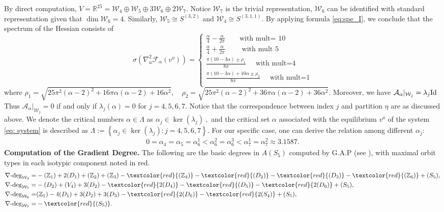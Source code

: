 \documentclass{amsart}%
\def\noi{\noindent}
\def\noi{\noindent}
\begin{document}
\noindent By direct computation,
$V=\mathbb R^{25}=\mathcal W_{4}\oplus \mathcal W_{5}\oplus 3\mathcal W_{6}\oplus 2\mathcal W_{7}.$
Notice $\mathcal W_{7}$ is the trivial representation, $\mathcal W_{6}$ can be identified with standard representation given that $\dim \mathcal W_{6}=4.$ Similarly, $\mathcal W_{5}\cong S^{(3,2)}$ and $\mathcal W_{4}\cong S^{(3,1,1)}.$ By applying formula \eqref{eq:spe_I}, we conclude that the spectrum of the Hessian consists of
\begin{equation}
\label{eq:spectrum}\sigma(\nabla^{2}_u\mathcal F_{\alpha}(v^{o}))=\begin{cases}
\frac{\alpha}{4}-\frac{\alpha}{2\pi}  \qquad  \text{
with mult= }10\\
\frac{\alpha}{4}+\frac{\alpha}{2\pi}\qquad  \text{ with mult }5\\
\frac{\pi(10-3\alpha)\pm \rho_1}{8\pi}\quad \text{ with mult=} 4\\
\frac{\pi(10-3\alpha)+10\alpha\pm \rho_2}{8\pi}\quad \text{ with mult=} 1\\
\end{cases}
\end{equation}
where $\rho_1=\sqrt{25\pi^2(\alpha-2)^2+16\pi\alpha(\alpha-2)+16\alpha^2},\quad \rho_2=\sqrt{25\pi^2(\alpha-2)^2+36\pi\alpha(\alpha-2)+36\alpha^2}.$
Moreover, we have
$\mathcal A_{\alpha}|_{\mathcal W_{j}}=\lambda_j  \text{\textrm{Id\,}}$
Thus $\mathcal A_{\alpha}|_{\mathcal W_{j}}=0$ if and only if $\lambda_j(\alpha)=0$ for $j=4,5,6,7$. Notice that the correspondence between index $j$ and partition $\eta$ are as discussed above. We denote the critical numbers $\alpha\in\Lambda$ as
$\alpha_{j}\in\ker(\lambda_j)~,$
and the critical set $\alpha$ associated with the equilibrium $v^{o}$ of the system
\eqref{eq: system} is described as
$\Lambda:=\left\{ \alpha_j\in \ker(\lambda_j):j=4,5,6,7\right\} .$
\noi For our specific case, one can derive the relation among different $\alpha_{j}:$
\begin{align}\label{sq:ordering}
0=\alpha_{4}=\alpha_{5}=\alpha_{6}^1<\alpha_{6}^2=\alpha_{6}^3<\alpha_{7}^1=\alpha_{7}^2\approx 3.1587.
\end{align}
\textbf{Computation of the Gradient Degree.}
The following are the basic degrees in $A(S_5)$ computed by G.A.P (see \cite{balanov2025degree}), with maximal orbit types in each isotypic component noted in red.
\begin{align}\label{eqn:basicdegree}
\nabla\text{-deg}_{\mathcal W_{4}}=&-(\mathbb Z_1)+2(D_1)+(\mathbb Z_2)+(\mathbb Z_3)-\textcolor{red}{(\mathbb Z_4)}-\textcolor{red}{(D_2)}-\textcolor{red}{(D_3)}-\textcolor{red}{(\mathbb Z_6)}+(S_5),\\
\nabla\text{-deg}_{\mathcal W_{5}}=&-(D_2)+(V_4)+3(D_2)-\textcolor{red}{2(D_4)}-\textcolor{red}{(D_5)}-\textcolor{red}{2(D_6)}+(S_5),\notag\\
\nabla\text{-deg}_{\mathcal W_{6}}=& (\mathbb Z_1)-4(D_1)+3(D_2)+3(D_3)-\textcolor{red}{2(D_6)}-\textcolor{red}{2(S_4)}+(S_5),\notag\\
\nabla\text{-deg}_{\mathcal W_{7}}=&-\textcolor{red}{(S_5)}.\nonumber
\end{align}
\end{document}
